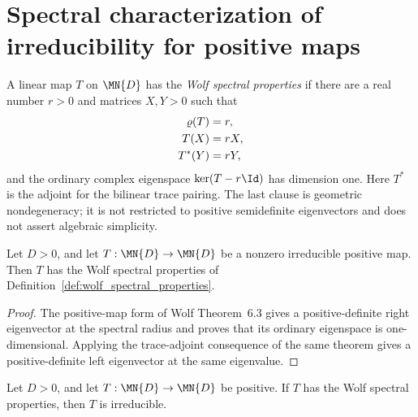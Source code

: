 \section{Spectral characterization of irreducibility for positive maps}

\begin{definition}
    \label{def:wolf_spectral_properties}
    \leanok
    A linear map $T$ on $\MN{D}$ has the \emph{Wolf spectral properties} if
    there are a real number $r>0$ and matrices $X,Y>0$ such that
    \begin{align}
        \varrho(T)&=r, \notag\\
        T(X)&=rX, \notag\\
        T^*(Y)&=rY,
        \label{eq:qpf_wolf_spectral_eigenvectors}
    \end{align}
    and the ordinary complex eigenspace $\ker(T-r\Id)$ has dimension one.
    Here $T^*$ is the adjoint for the bilinear trace pairing.  The last clause
    is geometric nondegeneracy; it is not restricted to positive semidefinite
    eigenvectors and does not assert algebraic simplicity.
\end{definition}

\begin{theorem}
    \label{thm:wolf_spectral_properties_irred_positive}
    \leanok
    Let $D>0$, and let $T:\MN{D}\to\MN{D}$ be a nonzero irreducible
    positive map.  Then $T$ has the Wolf spectral properties of
    Definition~\ref{def:wolf_spectral_properties}.
\end{theorem}

\begin{proof}
    \leanok
    The positive-map form of Wolf Theorem~6.3 gives a positive-definite right
    eigenvector at the spectral radius and proves that its ordinary eigenspace
    is one-dimensional.  Applying the trace-adjoint consequence of the same
    theorem gives a positive-definite left eigenvector at the same eigenvalue.
\end{proof}

\begin{theorem}
    \label{thm:irred_from_wolf_spectral_properties}
    \leanok
    Let $D>0$, and let $T:\MN{D}\to\MN{D}$ be positive.  If $T$ has the
    Wolf spectral properties, then $T$ is irreducible.
\end{theorem}

